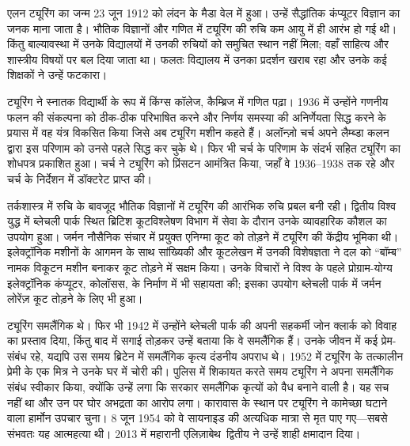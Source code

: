 \documentclass[../../../include/open-logic-section]{subfiles}
\begin{document}


एलन ट्यूरिंग का जन्म 23 जून 1912 को लंदन के मैडा वेल में हुआ। उन्हें
सैद्धांतिक कंप्यूटर विज्ञान का जनक माना जाता है। भौतिक विज्ञानों और गणित में
ट्यूरिंग की रुचि कम आयु में ही आरंभ हो गई थी। किंतु बाल्यावस्था में उनके
विद्यालयों में उनकी रुचियों को समुचित स्थान नहीं मिला; वहाँ साहित्य और
शास्त्रीय विषयों पर बल दिया जाता था। फलतः विद्यालय में उनका प्रदर्शन खराब
रहा और उनके कई शिक्षकों ने उन्हें फटकारा।


ट्यूरिंग ने स्नातक विद्यार्थी के रूप में किंग्स कॉलेज, कैम्ब्रिज में गणित
पढ़ा। 1936 में उन्होंने गणनीय फलन की संकल्पना को ठीक-ठीक परिभाषित करने और
निर्णय समस्या की अनिर्णेयता सिद्ध करने के प्रयास में वह यंत्र विकसित किया
जिसे अब ट्यूरिंग मशीन कहते हैं। अलॉन्ज़ो चर्च अपने लैम्ब्डा कलन द्वारा इस
परिणाम को उनसे पहले सिद्ध कर चुके थे। फिर भी चर्च के परिणाम के संदर्भ सहित
ट्यूरिंग का शोधपत्र प्रकाशित हुआ। चर्च ने ट्यूरिंग को प्रिंसटन आमंत्रित किया,
जहाँ वे 1936--1938 तक रहे और चर्च के निर्देशन में डॉक्टरेट प्राप्त की।

तर्कशास्त्र में रुचि के बावजूद भौतिक विज्ञानों में ट्यूरिंग की आरंभिक रुचि
प्रबल बनी रही। द्वितीय विश्व युद्ध में ब्लेचली पार्क स्थित ब्रिटिश
कूटविश्लेषण विभाग में सेवा के दौरान उनके व्यावहारिक कौशल का उपयोग हुआ। जर्मन
नौसैनिक संचार में प्रयुक्त एनिग्मा कूट को तोड़ने में ट्यूरिंग की केंद्रीय
भूमिका थी। इलेक्ट्रॉनिक मशीनों के आगमन के साथ सांख्यिकी और कूटलेखन में उनकी
विशेषज्ञता ने दल को ``बॉम्ब'' नामक विकूटन मशीन बनाकर कूट तोड़ने में सक्षम
किया। उनके विचारों ने विश्व के पहले प्रोग्राम-योग्य इलेक्ट्रॉनिक कंप्यूटर,
कोलॉसस, के निर्माण में भी सहायता की; इसका उपयोग ब्लेचली पार्क में जर्मन
लोरेंज़ कूट तोड़ने के लिए भी हुआ।

ट्यूरिंग समलैंगिक थे। फिर भी 1942 में उन्होंने ब्लेचली पार्क की अपनी
सहकर्मी जोन क्लार्क को विवाह का प्रस्ताव दिया, किंतु बाद में सगाई तोड़कर
उन्हें बताया कि वे समलैंगिक हैं। उनके जीवन में कई प्रेम-संबंध रहे, यद्यपि उस
समय ब्रिटेन में समलैंगिक कृत्य दंडनीय अपराध थे। 1952 में ट्यूरिंग के तत्कालीन
प्रेमी के एक मित्र ने उनके घर में चोरी की। पुलिस में शिकायत करते समय ट्यूरिंग
ने अपना समलैंगिक संबंध स्वीकार किया, क्योंकि उन्हें लगा कि सरकार समलैंगिक
कृत्यों को वैध बनाने वाली है। यह सच नहीं था और उन पर घोर अभद्रता का आरोप
लगा। कारावास के स्थान पर ट्यूरिंग ने कामेच्छा घटाने वाला हार्मोन उपचार चुना।
8 जून 1954 को वे सायनाइड की अत्यधिक मात्रा से मृत पाए गए---सबसे संभवतः यह
आत्महत्या थी। 2013 में महारानी एलिज़ाबेथ~द्वितीय ने उन्हें शाही क्षमादान
दिया।
\end{document}
